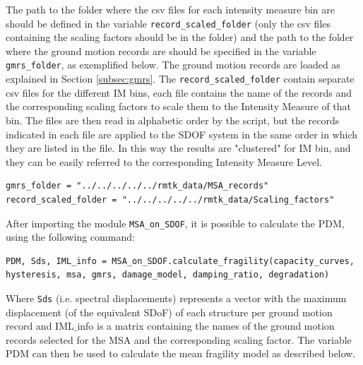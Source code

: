 The path to the folder where the csv files for each intensity measure bin are should be defined in the variable \verb=record_scaled_folder= (only the csv files containing the scaling factors should be in the folder) and the path to the folder where the ground motion records are should be specified in the variable \verb=gmrs_folder=, as exemplified below. The ground motion records are loaded as explained in Section \ref{subsec:gmrs}. The \verb=record_scaled_folder= contain separate csv files for the different IM bins, each file contains the name of the records and the corresponding scaling factors to scale them to the Intensity Measure of that bin. The files are then read in alphabetic order by the script, but the records indicated in each file are applied to the SDOF system in the same order in which they are listed in the file. In this way the results are "clustered" for IM bin, and they can be easily referred to the corresponding Intensity Measure Level.

\begin{Verbatim}[frame=single, commandchars=\\\{\}, samepage=true]
gmrs_folder = "../../../../../rmtk_data/MSA_records"
record_scaled_folder = "../../../../../rmtk_data/Scaling_factors"
\end{Verbatim}

After importing the module \verb=MSA_on_SDOF=, it is possible to calculate the PDM, using the following command:

\begin{Verbatim}[frame=single, commandchars=\\\{\}, samepage=true]
PDM, Sds, IML_info = MSA_on_SDOF.calculate_fragility(capacity_curves,
hysteresis, msa, gmrs, damage_model, damping_ratio, degradation)
\end{Verbatim}

Where \verb=Sds= (i.e. spectral displacements) represents a vector with the maximum displacement (of the equivalent SDoF) of each structure per ground motion record and IML$\_$info is a matrix containing the names of the ground motion records selected for the MSA and the corresponding scaling factor. The variable PDM can then be used to calculate the mean fragility model as described below.\\

